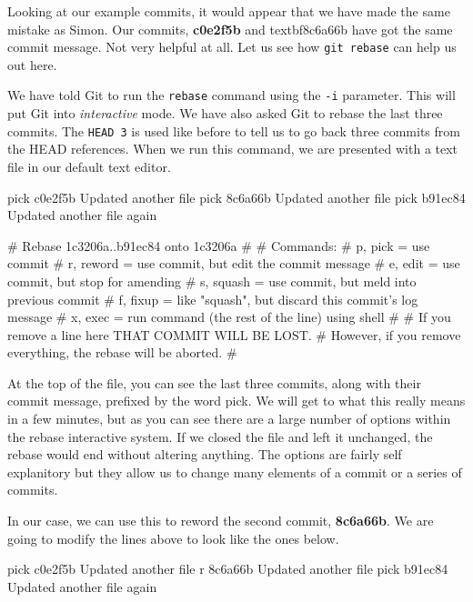 Looking at our example commits, it would appear that we have made the same mistake as Simon.  Our commits, \textbf{c0e2f5b} and textbf{8c6a66b} have got the same commit message.  Not very helpful at all.  Let us see how \texttt{git rebase} can help us out here.


We have told Git to run the \texttt{rebase} command using the \texttt{-i} parameter.  This will put Git into \emph{interactive} mode.  We have also asked Git to rebase the last three commits.  The \texttt{HEAD~3} is used like before to tell us to go back three commits from the HEAD references.  When we run this command, we are presented with a text file in our default text editor.

\begin{code}
pick c0e2f5b Updated another file
pick 8c6a66b Updated another file
pick b91ec84 Updated another file again

# Rebase 1c3206a..b91ec84 onto 1c3206a
#
# Commands:
#  p, pick = use commit
#  r, reword = use commit, but edit the commit message
#  e, edit = use commit, but stop for amending
#  s, squash = use commit, but meld into previous commit
#  f, fixup = like "squash", but discard this commit's log message
#  x, exec = run command (the rest of the line) using shell
#
# If you remove a line here THAT COMMIT WILL BE LOST.
# However, if you remove everything, the rebase will be aborted.
#
\end{code}

At the top of the file, you can see the last three commits, along with their commit message, prefixed by the word pick.  We will get to what this really means in a few minutes, but as you can see there are a large number of options within the rebase interactive system.  If we closed the file and left it unchanged, the rebase would end without altering anything.  The options are fairly self explanitory but they allow us to change many elements of a commit or a series of commits.  

In our case, we can use this to reword the second commit, \textbf{8c6a66b}.  We are going to modify the lines above to look like the ones below.

\begin{code}
pick c0e2f5b Updated another file
r 8c6a66b Updated another file
pick b91ec84 Updated another file again
\end{code}

